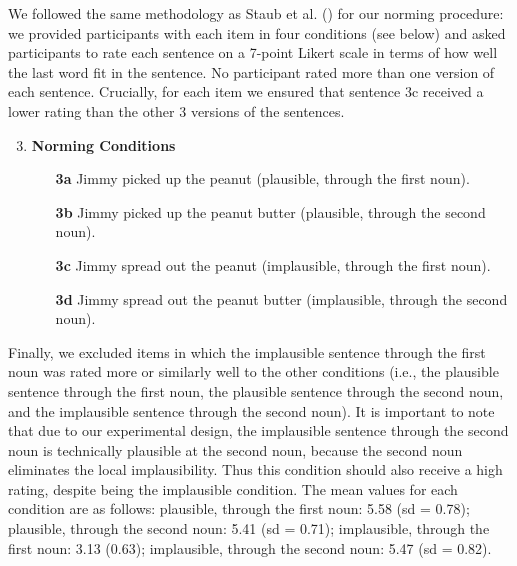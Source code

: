 \documentclass[
  12pt,
  letterpaper,
]{scrreprt}
\begin{document}
We followed the same methodology as Staub et al.
() for our norming
procedure: we provided participants with each item in four conditions
(see below) and asked participants to rate each sentence on a 7-point
Likert scale in terms of how well the last word fit in the sentence. No
participant rated more than one version of each sentence. Crucially, for
each item we ensured that sentence 3c received a lower rating than the
other 3 versions of the sentences.

\begin{enumerate} \setcounter{enumi}{2}
   \item \textbf{Norming Conditions}
    \begin{enumerate}
        \item[\textbf{3a}] Jimmy picked up the peanut (plausible, through the first noun).
        \item[\textbf{3b}] Jimmy picked up the peanut butter (plausible, through the second noun).
        \item[\textbf{3c}] Jimmy spread out the peanut (implausible, through the first noun).
        \item[\textbf{3d}] Jimmy spread out the peanut butter (implausible, through the second noun).
    \end{enumerate} \label{figanext}
\end{enumerate}

Finally, we excluded items in which the implausible sentence through the
first noun was rated more or similarly well to the other conditions
(i.e., the plausible sentence through the first noun, the plausible
sentence through the second noun, and the implausible sentence through
the second noun). It is important to note that due to our experimental
design, the implausible sentence through the second noun is technically
plausible at the second noun, because the second noun eliminates the
local implausibility. Thus this condition should also receive a high
rating, despite being the implausible condition. The mean values for
each condition are as follows: plausible, through the first noun: 5.58
(sd = 0.78); plausible, through the second noun: 5.41 (sd = 0.71);
implausible, through the first noun: 3.13 (0.63); implausible, through
the second noun: 5.47 (sd = 0.82).
\end{document}
